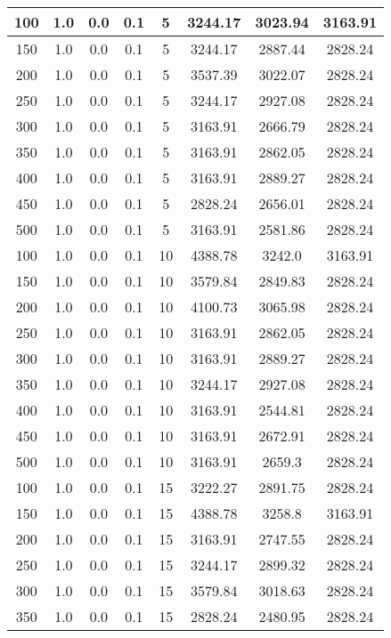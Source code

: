 \documentclass[a4paper, 12pt]{extreport}
\begin{document}
\begin{itemize}
\begin{longtable}{|c|c|c|c|c|c|c|c|}
			100 & 1.0 & 0.0 & 0.1 & 5 & 3244.17 & 3023.94 & 3163.91 \\\hline
			150 & 1.0 & 0.0 & 0.1 & 5 & 3244.17 & 2887.44 & 2828.24 \\\hline
			200 & 1.0 & 0.0 & 0.1 & 5 & 3537.39 & 3022.07 & 2828.24 \\\hline
			250 & 1.0 & 0.0 & 0.1 & 5 & 3244.17 & 2927.08 & 2828.24 \\\hline
			300 & 1.0 & 0.0 & 0.1 & 5 & 3163.91 & 2666.79 & 2828.24 \\\hline
			350 & 1.0 & 0.0 & 0.1 & 5 & 3163.91 & 2862.05 & 2828.24 \\\hline
			400 & 1.0 & 0.0 & 0.1 & 5 & 3163.91 & 2889.27 & 2828.24 \\\hline
			450 & 1.0 & 0.0 & 0.1 & 5 & 2828.24 & 2656.01 & 2828.24 \\\hline
			500 & 1.0 & 0.0 & 0.1 & 5 & 3163.91 & 2581.86 & 2828.24 \\\hline
			100 & 1.0 & 0.0 & 0.1 & 10 & 4388.78 & 3242.0 & 3163.91 \\\hline
			150 & 1.0 & 0.0 & 0.1 & 10 & 3579.84 & 2849.83 & 2828.24 \\\hline
			200 & 1.0 & 0.0 & 0.1 & 10 & 4100.73 & 3065.98 & 2828.24 \\\hline
			250 & 1.0 & 0.0 & 0.1 & 10 & 3163.91 & 2862.05 & 2828.24 \\\hline
			300 & 1.0 & 0.0 & 0.1 & 10 & 3163.91 & 2889.27 & 2828.24 \\\hline
			350 & 1.0 & 0.0 & 0.1 & 10 & 3244.17 & 2927.08 & 2828.24 \\\hline
			400 & 1.0 & 0.0 & 0.1 & 10 & 3163.91 & 2544.81 & 2828.24 \\\hline
			450 & 1.0 & 0.0 & 0.1 & 10 & 3163.91 & 2672.91 & 2828.24 \\\hline
			500 & 1.0 & 0.0 & 0.1 & 10 & 3163.91 & 2659.3 & 2828.24 \\\hline
			100 & 1.0 & 0.0 & 0.1 & 15 & 3222.27 & 2891.75 & 2828.24 \\\hline
			150 & 1.0 & 0.0 & 0.1 & 15 & 4388.78 & 3258.8 & 3163.91 \\\hline
			200 & 1.0 & 0.0 & 0.1 & 15 & 3163.91 & 2747.55 & 2828.24 \\\hline
			250 & 1.0 & 0.0 & 0.1 & 15 & 3244.17 & 2899.32 & 2828.24 \\\hline
			300 & 1.0 & 0.0 & 0.1 & 15 & 3579.84 & 3018.63 & 2828.24 \\\hline
			350 & 1.0 & 0.0 & 0.1 & 15 & 2828.24 & 2480.95 & 2828.24 \\\hline

\end{longtable}
\end{itemize}
\end{document}
